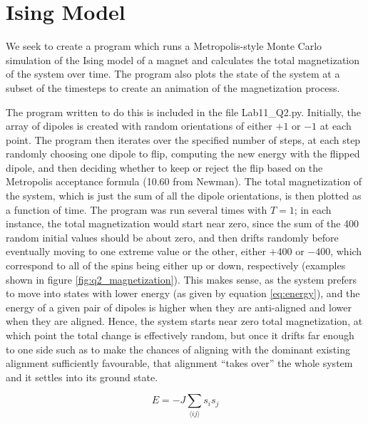 \documentclass{article}
\begin{document}
\section{Ising Model}

We seek to create a program which runs a Metropolis-style Monte Carlo simulation of the Ising model
of a magnet and calculates the total magnetization of the system over time. The
program also plots the state of the system at a subset of the timesteps to
create an animation of the magnetization process.

The program written to do this is included in the file Lab11\_Q2.py. Initially, the array of dipoles is created with random orientations of either $+1$ or $-1$ at each point. The program then iterates over the specified number of steps, at each step randomly choosing one dipole to flip, computing the new energy with the flipped dipole, and then deciding whether to keep or reject the flip based on the Metropolis acceptance formula (10.60 from Newman). The total magnetization of the system, which is just the sum of all the dipole orientations, is then plotted as a function of time. The program was run several times with $T=1$; in each instance, the total magnetization would start near zero, since the sum of the 400 random initial values should be about zero, and then drifts randomly before eventually moving to one extreme value or the other, either $+400$ or $-400$, which correspond to all of the spins being either up or down, respectively (examples shown in figure \ref{fig:q2_magnetization}). This makes sense, as the system prefers to move into states with lower energy (as given by equation \ref{eq:energy}), and the energy of a given pair of dipoles is higher when they are anti-aligned and lower when they are aligned. Hence, the system starts near zero total magnetization, at which point the total change is effectively random, but once it drifts far enough to one side such as to make the chances of aligning with the dominant existing alignment sufficiently favourable, that alignment ``takes over'' the whole system and it settles into its ground state.

\begin{equation}
	E = -J\sum_{\langle ij \rangle}s_i s_j
	\label{eq:energy}
\end{equation}
\end{document}
